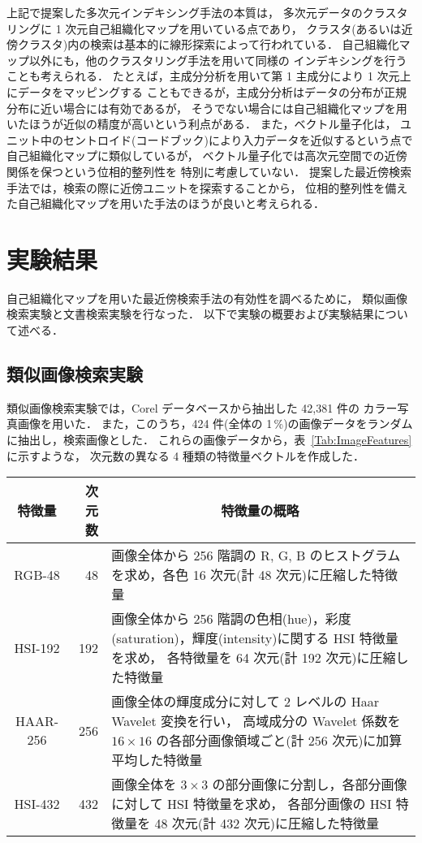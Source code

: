 上記で提案した多次元インデキシング手法の本質は，
多次元データのクラスタリングに 1 次元自己組織化マップを用いている点であり，
クラスタ(あるいは近傍クラスタ)内の検索は基本的に線形探索によって行われている．
自己組織化マップ以外にも，他のクラスタリング手法を用いて同様の
インデキシングを行うことも考えられる．
たとえば，主成分分析を用いて第 1 主成分により 1 次元上にデータをマッピングする
こともできるが，主成分分析はデータの分布が正規分布に近い場合には有効であるが，
そうでない場合には自己組織化マップを用いたほうが近似の精度が高いという利点がある．
また，ベクトル量子化は，
ユニット中のセントロイド(コードブック)により入力データを近似するという点で
自己組織化マップに類似しているが，
ベクトル量子化では高次元空間での近傍関係を保つという位相的整列性を
特別に考慮していない．
提案した最近傍検索手法では，検索の際に近傍ユニットを探索することから，
位相的整列性を備えた自己組織化マップを用いた手法のほうが良いと考えられる．


\section{実験結果}

自己組織化マップを用いた最近傍検索手法の有効性を調べるために，
類似画像検索実験と文書検索実験を行なった．
以下で実験の概要および実験結果について述べる．

\subsection{類似画像検索実験}
\label{Sec:ImageRetrieval}

類似画像検索実験では，Corel データベースから抽出した 42,381 件の
カラー写真画像を用いた．
また，このうち，424 件(全体の 1\,\%)の画像データをランダムに抽出し，検索画像とした．
これらの画像データから，表~\ref{Tab:ImageFeatures} に示すような，
次元数の異なる 4 種類の特徴量ベクトルを作成した．

\begin{table*}[t]
\begin{center}
\caption{画像検索実験に用いた特徴量}
\label{Tab:ImageFeatures}
\begin{tabular}{c|r|p{10cm}}
\hline
\hline
特徴量	& 次元数 & \multicolumn{1}{c}{特徴量の概略} \\
\hline
RGB-48  & 48
	& 画像全体から 256 階調の R, G, B のヒストグラムを求め，各色 16 次元(計 48 次元)に圧縮した特徴量 \\
\hline
HSI-192 & 192
	& 画像全体から 256 階調の色相(hue)，彩度(saturation)，輝度(intensity)に関する HSI 特徴量を求め，
各特徴量を 64 次元(計 192 次元)に圧縮した特徴量\\
\hline
HAAR-256 & 256
	& 画像全体の輝度成分に対して 2 レベルの Haar Wavelet 変換を行い，
高域成分の Wavelet 係数を $16 \times 16$ の各部分画像領域ごと(計 256 次元)に加算平均した特徴量\\
\hline
HSI-432	& 432
	& 画像全体を $3 \times 3$ の部分画像に分割し，各部分画像に対して HSI 特徴量を求め，
各部分画像の HSI 特徴量を 48 次元(計 432 次元)に圧縮した特徴量\\
\hline
\end{tabular}
\end{center}
\end{table*}

